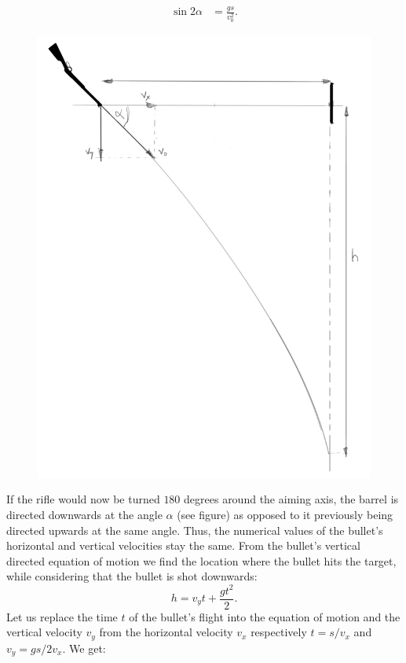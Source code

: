 \documentclass[11pt]{article}
\begin{document}
{\begin{align*}
\sin2\alpha & = \frac{gs}{v_{0}^{2}}.
\end{align*} 
\begin{figure}
	\vspace{-20pt}
	\includegraphics[width = \linewidth]{2016-v2g-06-Lasketiir-2.PNG}
\end{figure}
If the rifle would now be turned $180$ degrees around the aiming axis, the barrel is directed downwards at the angle $\alpha$ (see figure) as opposed to it previously being directed upwards at the same angle. Thus, the numerical values of the bullet’s horizontal and vertical velocities stay the same. From the bullet’s vertical directed equation of motion we find the location where the bullet hits the target, while considering that the bullet is shot downwards:
$$
h=v_{y}t+\frac{gt^2}{2}.
$$ 
Let us replace the time $t$ of the bullet’s flight into the equation of motion and the vertical velocity $v_y$ from the horizontal velocity $v_x$ respectively $t=s / v_x$ and $v_y = gs/2v_x$. We get:
}
\end{document}
